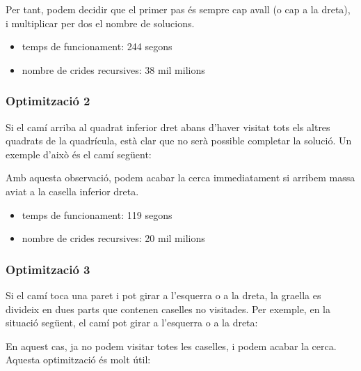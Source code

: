 Per tant, podem decidir que el primer pas és sempre cap avall
(o cap a la dreta),
i multiplicar per dos el nombre de solucions.

\begin{itemize}
\item
temps de funcionament: 244 segons
\item
nombre de crides recursives: 38 mil milions
\end{itemize}

\subsubsection{Optimització 2}

Si el camí arriba al quadrat inferior dret
abans d'haver visitat tots els altres quadrats de la quadrícula,
està clar que no serà possible completar la solució.
Un exemple d'això és el camí següent:

\begin{center}
\end{center}
Amb aquesta observació, podem acabar la cerca
immediatament si arribem massa aviat a la casella inferior dreta.
\begin{itemize}
\item
temps de funcionament: 119 segons
\item
nombre de crides recursives: 20 mil milions
\end{itemize}

\subsubsection{Optimització 3}

Si el camí toca una paret
i pot girar a l'esquerra o a la dreta,
la graella es divideix en dues parts
que contenen caselles no visitades.
Per exemple, en la situació següent,
el camí pot girar a l'esquerra o a la dreta:

\begin{center}
\end{center}
En aquest cas, ja no podem visitar totes les caselles,
i podem acabar la cerca. Aquesta optimització és molt útil:

